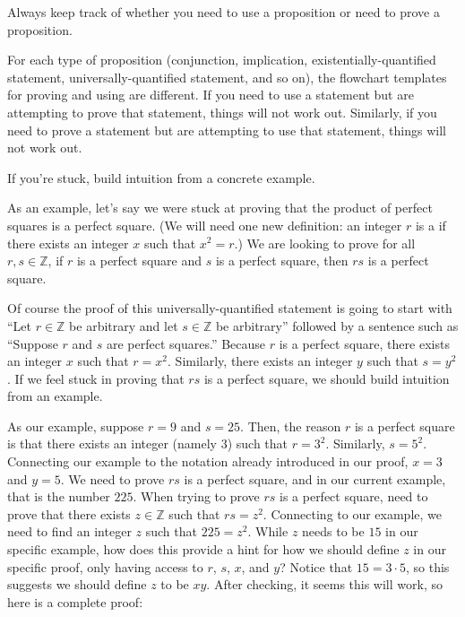 \documentclass{book}
\theoremstyle{ekimcustom}
\newcommand\defn[1]{{\color{blue}{\bf #1}}}
\begin{document}
\begin{bhabit}{}{}
Always keep track of whether you need to use a proposition or need to prove a proposition.
\end{bhabit}
For each type of proposition (conjunction, implication, existentially-quantified statement, universally-quantified statement, and so on), the flowchart templates for proving and using are different. If you need to use a statement but are attempting to prove that statement, things will not work out. Similarly, if you need to prove a statement but are attempting to use that statement, things will not work out.


\begin{bhabit}{}{}
If you're stuck, build intuition from a concrete example.
\end{bhabit}
As an example, let's say we were stuck at proving that the product of perfect squares is a perfect square. (We will need one new definition: an integer $r$ is a \defn{perfect square} if there exists an integer $x$ such that $x^2=r$.) We are looking to prove for all $r,s \in \mathbb{Z}$, if $r$ is a perfect square and $s$ is a perfect square, then $rs$ is a perfect square.

Of course the proof of this universally-quantified statement is going to start with ``Let $r \in \mathbb{Z}$ be arbitrary and let $s \in \mathbb{Z}$ be arbitrary'' followed by a sentence such as ``Suppose $r$ and $s$ are perfect squares.'' Because $r$ is a perfect square, there exists an integer $x$ such that $r=x^2$. Similarly, there exists an integer $y$ such that $s=y^2$. If we feel stuck in proving that $rs$ is a perfect square, we should build intuition from an example.

As our example, suppose $r=9$ and $s=25$. Then, the reason $r$ is a perfect square is that there exists an integer (namely $3$) such that $r=3^2$. Similarly, $s=5^2$. Connecting our example to the notation already introduced in our proof, $x=3$ and $y=5$. We need to prove $rs$ is a perfect square, and in our current example, that is the number $225$. When trying to prove $rs$ is a perfect square, need to prove that there exists $z \in \mathbb{Z}$ such that $rs=z^2$. Connecting to our example, we need to find an integer $z$ such that $225=z^2$. While $z$ needs to be $15$ in our specific example, how does this provide a hint for how we should define $z$ in our specific proof, only having access to $r$, $s$, $x$, and $y$? Notice that $15 = 3 \cdot 5$, so this suggests we should define $z$ to be $xy$. After checking, it seems this will work, so here is a complete proof:
\end{document}
